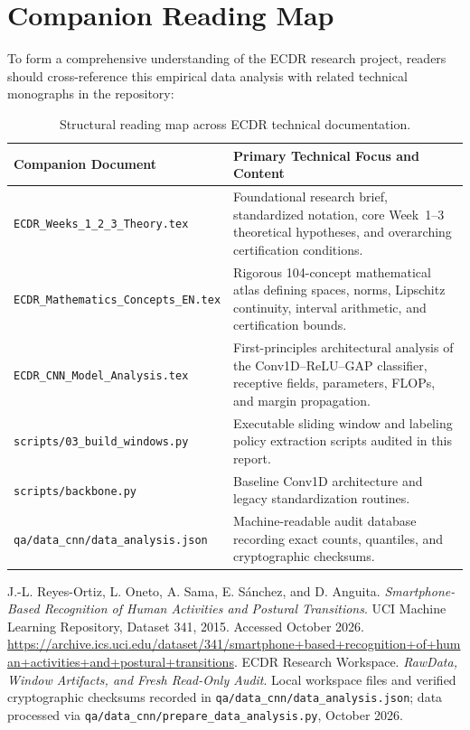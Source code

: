 \documentclass[11pt,a4paper]{article}
\newcommand{\code}[1]{{\small\ttfamily\nolinkurl{#1}}}
\theoremstyle{definition}
\begin{document}
\section{Companion Reading Map}
To form a comprehensive understanding of the ECDR research project, readers should cross-reference this empirical data analysis with related technical monographs in the repository:

\begin{table}[htbp]\centering\small
\begin{tabularx}{\linewidth}{@{}P{4.2cm}Y@{}}\toprule
Companion Document & Primary Technical Focus and Content\\\midrule
\code{ECDR_Weeks_1_2_3_Theory.tex} & Foundational research brief, standardized notation, core Week~1--3 theoretical hypotheses, and overarching certification conditions.\\
\code{ECDR_Mathematics_Concepts_EN.tex} & Rigorous 104-concept mathematical atlas defining spaces, norms, Lipschitz continuity, interval arithmetic, and certification bounds.\\
\code{ECDR_CNN_Model_Analysis.tex} & First-principles architectural analysis of the Conv1D--ReLU--GAP classifier, receptive fields, parameters, FLOPs, and margin propagation.\\
\code{scripts/03_build_windows.py} & Executable sliding window and labeling policy extraction scripts audited in this report.\\
\code{scripts/backbone.py} & Baseline Conv1D architecture and legacy standardization routines.\\
\code{qa/data_cnn/data_analysis.json} & Machine-readable audit database recording exact counts, quantiles, and cryptographic checksums.\\\bottomrule
\end{tabularx}
\caption{Structural reading map across ECDR technical documentation.}
\end{table}

\begin{thebibliography}{9}
 J.-L. Reyes-Ortiz, L. Oneto, A. Sama, E. S{\'a}nchez, and D. Anguita. \emph{Smartphone-Based Recognition of Human Activities and Postural Transitions}. UCI Machine Learning Repository, Dataset 341, 2015. Accessed October 2026. \url{https://archive.ics.uci.edu/dataset/341/smartphone+based+recognition+of+human+activities+and+postural+transitions}.
 ECDR Research Workspace. \emph{RawData, Window Artifacts, and Fresh Read-Only Audit}. Local workspace files and verified cryptographic checksums recorded in \code{qa/data_cnn/data_analysis.json}; data processed via \code{qa/data_cnn/prepare_data_analysis.py}, October 2026.
\end{thebibliography}
\end{document}
